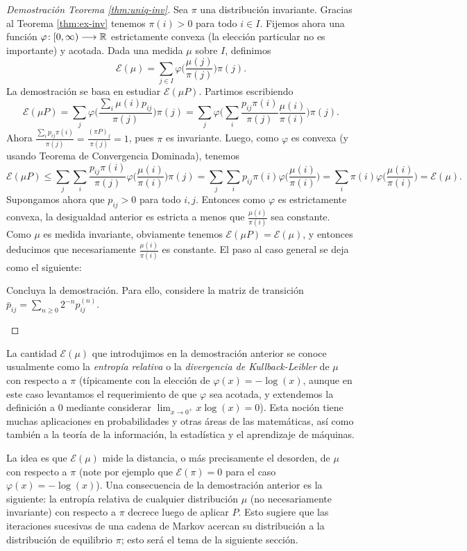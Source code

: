 \begin{proof}[Demostración Teorema \ref{thm:uniq-inv}]
Sea $\pi$ una distribución invariante.
Gracias al Teorema \ref{thm:ex-inv} tenemos $\pi(i)>0$ para todo $i\in I$.
Fijemos ahora una función $\varphi\!:[0,\infty)\longrightarrow\mathbb{R}$ estrictamente convexa (la elección particular no es importante) y acotada.
Dada una medida $\mu$ sobre $I$, definimos
\[\mathcal{E}(\mu)=\sum_{j\in I}\varphi\Big(\frac{\mu(j)}{\pi(j)}\Big)\pi(j).\]
La demostración se basa en estudiar $\mathcal{E}(\mu P)$.
Partimos escribiendo
\[\mathcal{E}(\mu P)=\sum_{j}\varphi\Big(\frac{\sum_i\mu(i)p_{ij}}{\pi(j)}\Big)\pi(j)
=\sum_{j}\varphi\Big(\sum_i\frac{p_{ij}\pi(i)}{\pi(j)}\frac{\mu(i)}{\pi(i)}\Big)\pi(j).\]
Ahora $\frac{\sum_ip_{ij}\pi(i)}{\pi(j)}=\frac{(\pi P)_j}{\pi(j)}=1$, pues $\pi$ es invariante.
Luego, como $\varphi$ es convexa (y usando Teorema de Convergencia Dominada), tenemos
\[\mathcal{E}(\mu P)\leq\sum_{j}\sum_i\frac{p_{ij}\pi(i)}{\pi(j)}\varphi\Big(\frac{\mu(i)}{\pi(i)}\Big)\pi(j)=\sum_{j}\sum_ip_{ij}\pi(i)\varphi\Big(\frac{\mu(i)}{\pi(i)}\Big)
=\sum_i\pi(i)\varphi\Big(\frac{\mu(i)}{\pi(i)}\Big)=\mathcal{E}(\mu).\]
Supongamos ahora que $p_{ij}>0$ para todo $i,j$.
Entonces como $\varphi$ es estrictamente convexa, la desigualdad anterior es estricta a menos que $\frac{\mu(i)}{\pi(i)}$ sea constante.
Como $\mu$ es medida invariante, obviamente tenemos $\mathcal{E}(\mu P)=\mathcal{E}(\mu)$, y entonces deducimos que necesariamente $\frac{\mu(i)}{\pi(i)}$ es constante.
El paso al caso general se deja como el siguiente:
\begin{exer}
Concluya la demostración.
Para ello, considere la matriz de transición $\bar p_{ij}=\sum_{n\geq0}2^{-n}p^{(n)}_{ij}$.\qedhere
\end{exer}
\end{proof}

\begin{rem}
La cantidad $\mathcal{E}(\mu)$ que introdujimos en la demostración anterior se conoce usualmente como la \emph{entropía relativa} o la \emph{divergencia de Kullback-Leibler} de $\mu$ con respecto a $\pi$ (típicamente con la elección de $\varphi(x)=-\log(x)$, aunque en este caso levantamos el requerimiento de que $\varphi$ sea acotada, y extendemos la definición a $0$ mediante considerar $\lim_{x\to0^+}x\log(x)=0$).
Esta noción tiene muchas aplicaciones en probabilidades y otras áreas de las matemáticas, así como también a la teoría de la información, la estadística y el aprendizaje de máquinas.

\noindent La idea es que $\mathcal{E}(\mu)$ mide la distancia, o más precisamente el desorden, de $\mu$ con respecto a $\pi$ (note por ejemplo que $\mathcal{E}(\pi)=0$ para el caso $\varphi(x)=-\log(x)$).
Una consecuencia de la demostración anterior es la siguiente: la entropía relativa de cualquier distribución $\mu$ (no necesariamente invariante) con respecto a $\pi$ decrece luego de aplicar $P$.
Esto sugiere que las iteraciones sucesivas de una cadena de Markov acercan su distribución a la distribución de equilibrio $\pi$; esto será el tema de la siguiente sección.
\end{rem}

